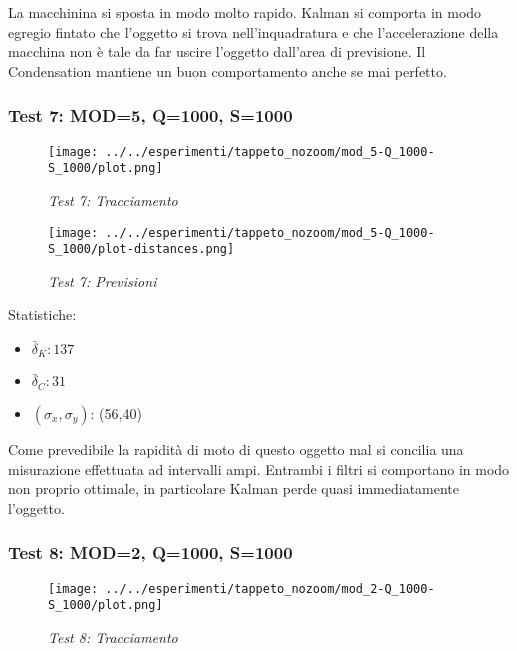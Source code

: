 La macchinina si sposta in modo molto rapido. Kalman si comporta in modo egregio fintato che l'oggetto si trova nell'inquadratura e che l'accelerazione della macchina non è tale da far uscire l'oggetto dall'area di previsione. Il Condensation mantiene un buon comportamento anche se mai perfetto.

\newpage
\subsubsection{Test 7: MOD=5, Q=1000, S=1000}

\begin{figure}[hb]
\centering
\texttt{[image: ../../esperimenti/tappeto\_nozoom/mod\_5-Q\_1000-S\_1000/plot.png]}
\caption{\textit{Test 7: Tracciamento}}
\end{figure}

\begin{figure}[hb]
\centering
\texttt{[image: ../../esperimenti/tappeto\_nozoom/mod\_5-Q\_1000-S\_1000/plot-distances.png]}
\caption{\textit{Test 7: Previsioni}}
\end{figure}

Statistiche:
\begin{itemize}
\item \begin{math} \bar \delta_K: 137 \end{math}
\item \begin{math} \bar \delta_C: 31\end{math}
\item \begin{math}(\sigma_x,\sigma_y)\end{math}: (56,40)
\end{itemize} 

Come prevedibile la rapidità di moto di questo oggetto mal si concilia una misurazione effettuata ad intervalli ampi. Entrambi i filtri si comportano in modo non proprio ottimale, in particolare Kalman perde quasi immediatamente l'oggetto. 

\newpage
\subsubsection{Test 8: MOD=2, Q=1000, S=1000}

\begin{figure}[hb]
\centering
\texttt{[image: ../../esperimenti/tappeto\_nozoom/mod\_2-Q\_1000-S\_1000/plot.png]}
\caption{\textit{Test 8: Tracciamento}}
\end{figure}

